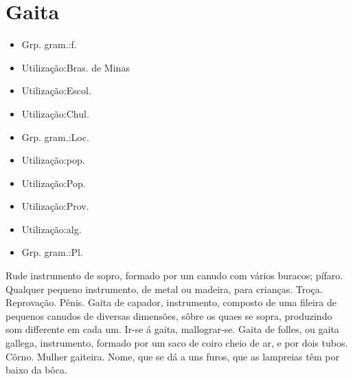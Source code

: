 \section{Gaita}
\begin{itemize}
\item {Grp. gram.:f.}
\end{itemize}
\begin{itemize}
\item {Utilização:Bras. de Minas}
\end{itemize}
\begin{itemize}
\item {Utilização:Escol.}
\end{itemize}
\begin{itemize}
\item {Utilização:Chul.}
\end{itemize}
\begin{itemize}
\item {Grp. gram.:Loc.}
\end{itemize}
\begin{itemize}
\item {Utilização:pop.}
\end{itemize}
\begin{itemize}
\item {Utilização:Pop.}
\end{itemize}
\begin{itemize}
\item {Utilização:Prov.}
\end{itemize}
\begin{itemize}
\item {Utilização:alg.}
\end{itemize}
\begin{itemize}
\item {Grp. gram.:Pl.}
\end{itemize}
Rude instrumento de sopro, formado por um canudo com vários buracos; pífaro.
Qualquer pequeno instrumento, de metal ou madeira, para crianças.
Troça.
Reprovação.
Pênis.
\textunderscore Gaita de capador\textunderscore , instrumento, composto de uma fileira de pequenos canudos de diversas dimensões, sôbre os quaes se sopra, produzindo som differente em cada um.
\textunderscore Ir-se á gaita\textunderscore , mallograr-se.
\textunderscore Gaita de folles\textunderscore , ou \textunderscore gaita gallega\textunderscore , instrumento, formado por um saco de coiro cheio de ar, e por dois tubos.
Côrno.
Mulher gaiteira.
Nome, que se dá a uns furos, que as lampreias têm por baixo da bôca.
